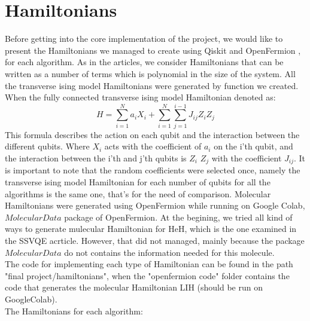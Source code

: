 \documentclass[12pt, a4paper]{article}
\begin{document}
    \section{Hamiltonians}
    Before getting into  the core implementation of the project, we would like to present the Hamiltonians we managed to create using Qiskit and OpenFermion \cite{mcclean2020openfermion}, for each algorithm.
    As in the articles, we consider Hamiltonians that can be written as a number of terms which is polynomial in the size of the system.
    All the transverse ising model Hamiltonians were generated by function we created.
    When the fully connected transverse ising model Hamiltonian denoted as:
    \begin{equation}
        H = \sum_{i=1}^{N} {a_i X_i}+\sum_{i=1}^{N} \sum_{j=1}^{i-1}{J_{ij} Z_i Z_j}
    \end{equation}
    This formula describes the action on each qubit and the interaction between the different qubits.
    Where $X_i$ acts with the coefficient of $a_i$ on the i'th qubit, and the interaction between the i'th and j'th qubits is $Z_i$ $Z_j$ with the coefficient $J_{ij}$.
    It is important to note that the random coefficients were selected once, namely the transverse ising model Hamiltonian for each number of qubits for all the algorithms is the same one, that's for the need of comparison.
    Molecular Hamiltonians were generated using OpenFermion while running on Google Colab, ${Molecular Data}$ package of OpenFermion. At the begining, we tried all kind of ways to generate mulecular Hamiltonian for HeH, which is the one examined in the SSVQE acrticle. However, that did not managed, mainly because the package $Molecular Data$ do not contains the information needed for this molecule.\\
    The code for implementing each type of Hamiltonian can be found in the path "final project/hamiltonians", when the "openfermion code" folder contains the code that generates the molecular Hamiltonian LIH (should be run on GoogleColab).\\
    The Hamiltonians for each algorithm:
\end{document}
